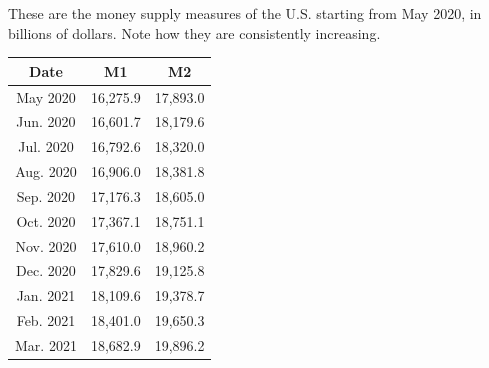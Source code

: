 \documentclass{article}
\begin{document}
    \begin{example}
      These are the money supply measures of the U.S. starting from May 2020, in billions of dollars. Note how they are consistently increasing. 
      \begin{center}
      \begin{tabular}{c|c|c}
        Date & M1 & M2 \\
        \hline
        May 2020 & 16,275.9&17,893.0\\
        Jun. 2020 & 16,601.7&18,179.6\\	
        Jul. 2020 & 16,792.6&18,320.0\\
        Aug. 2020 & 16,906.0&18,381.8\\
        Sep. 2020 & 17,176.3&18,605.0\\
        Oct. 2020 & 17,367.1&18,751.1\\
        Nov. 2020 & 17,610.0&18,960.2\\
        Dec. 2020 & 17,829.6&19,125.8\\
        Jan. 2021 & 18,109.6&19,378.7\\
        Feb. 2021 & 18,401.0&19,650.3\\
        Mar. 2021 & 18,682.9&19,896.2
      \end{tabular}
      \end{center}
    \end{example}
\end{document}

